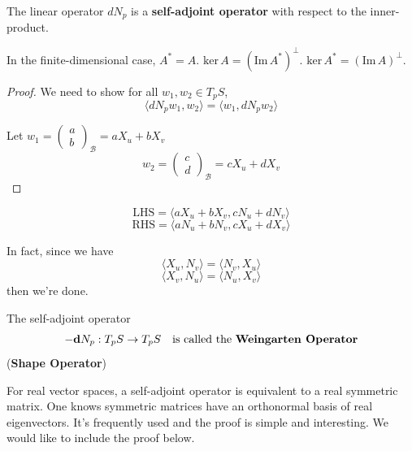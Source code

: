 \documentclass{article}
\begin{document}
\begin{proposition}
    The linear operator $d N_p$ is a \textbf{self-adjoint operator} with respect to the inner-product.
\end{proposition}

\begin{remark}
    In the finite-dimensional case, $A^* = A$. $\text{ker} \, A = (\text{Im} \, A^*)^\perp$. $\text{ker} \, A^* = (\text{Im} \, A)^\perp$.
\end{remark}

\begin{proof}
    We need to show for all $w_1, w_2 \in T_p S$,
    $$\langle d N_p w_1, w_2 \rangle = \langle w_1, d N_p w_2 \rangle$$

    Let $w_1 = \begin{pmatrix} a \\ b \end{pmatrix}_{\mathcal{B}} = a X_u + b X_v$
    $$w_2 = \begin{pmatrix} c \\ d \end{pmatrix}_{\mathcal{B}} = c X_u + d X_v$$
\end{proof}

$$\text{LHS} = \langle a X_u + b X_v, c N_u + d N_v \rangle$$
$$\text{RHS} = \langle a N_u + b N_v, c X_u + d X_v \rangle$$

In fact, since we have
$$\langle X_u, N_v \rangle = \langle N_v, X_u \rangle$$
$$\langle X_v, N_u \rangle = \langle N_u, X_v \rangle$$
then we're done.

\begin{definition}
    The self-adjoint operator
    $$-\textbf{d} N_p: T_p S \to T_p S \quad \text{is called the \textbf{Weingarten Operator}}$$
    (\textbf{Shape Operator})
\end{definition}

\begin{corollary}
    For real vector spaces, a self-adjoint operator is equivalent to a real symmetric matrix.
    One knows symmetric matrices have an orthonormal basis of real eigenvectors.
    It's frequently used and the proof is simple and interesting.
    We would like to include the proof below.
\end{corollary}
\end{document}
